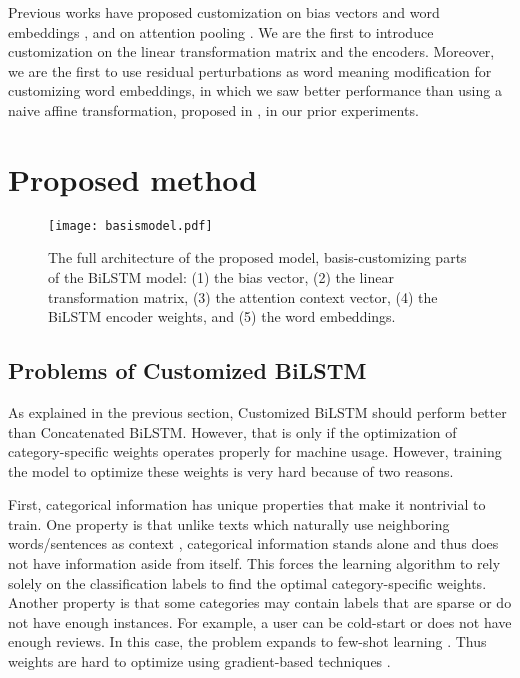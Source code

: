 \documentclass[11pt,a4paper]{article}
\begin{document}
Previous works have proposed customization on bias vectors and word embeddings \cite{tang2015learning}, and on attention pooling \cite{chen2016neural}. We are the first to introduce customization on the linear transformation matrix and the encoders. Moreover, we are the first to use residual perturbations as word meaning modification for customizing word embeddings, in which we saw better performance than using a naive affine transformation, proposed in \cite{tang2015learning}, in our prior experiments.

\section{Proposed method}

\begin{figure*}[t]
    \centering
    \texttt{[image: basismodel.pdf]}
    \caption{The full architecture of the proposed model, basis-customizing parts of the \mbox{BiLSTM} model: (1) the bias vector, (2) the linear transformation matrix, (3) the attention context vector, (4) the BiLSTM encoder weights, and (5) the word embeddings.}
    \label{fig:basismodel}
\end{figure*}

\subsection{Problems of Customized \mbox{BiLSTM}}

As explained in the previous section, Customized \mbox{BiLSTM} should perform better than Concatenated \mbox{BiLSTM}. However, that is only if the optimization of category-specific weights operates properly for machine usage. However, training the model to optimize these weights is very hard because of two reasons.

First, categorical information has unique properties that make it nontrivial to train. One property is that unlike texts which naturally use neighboring words/sentences as context \cite{lin2015hierarchical,peters2018deep}, categorical information stands alone and thus does not have information aside from itself. This forces the learning algorithm to rely solely on the classification labels  to find the optimal category-specific weights. Another property is that some categories may contain labels that are sparse or do not have enough instances. For example, a user can be cold-start \cite{lam2008addressing} or does not have enough reviews. In this case, the problem expands to few-shot learning \cite{fei2006one}. Thus weights are hard to optimize using gradient-based techniques \cite{ravi2016optimization}.
\end{document}
